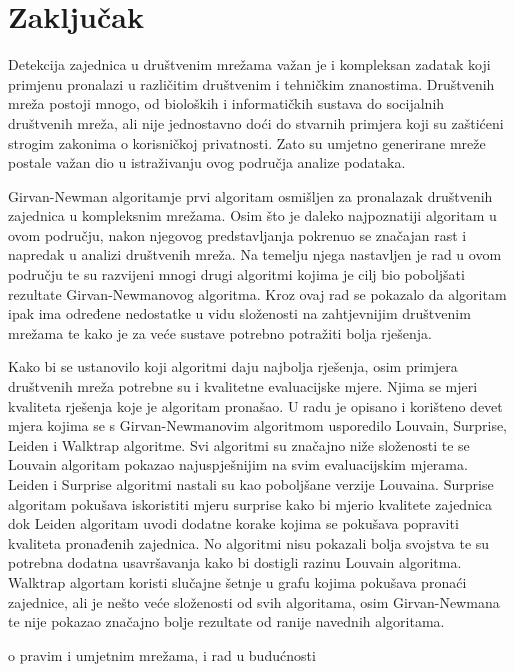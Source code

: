 \chapter{Zaključak}

Detekcija zajednica u društvenim mrežama važan je i kompleksan zadatak koji primjenu pronalazi u različitim društvenim i tehničkim znanostima. Društvenih mreža postoji mnogo, od bioloških i informatičkih sustava do socijalnih društvenih mreža, ali nije jednostavno doći do stvarnih primjera koji su zaštićeni strogim zakonima o korisničkoj privatnosti. Zato su umjetno generirane mreže postale važan dio u istraživanju ovog područja analize podataka.

Girvan-Newman algoritamje prvi algoritam osmišljen za pronalazak društvenih zajednica u kompleksnim mrežama. Osim što je daleko najpoznatiji algoritam u ovom području, nakon njegovog predstavljanja pokrenuo se značajan rast i napredak u analizi društvenih mreža. Na temelju njega nastavljen je rad u ovom području te su razvijeni mnogi drugi algoritmi kojima je cilj bio poboljšati rezultate Girvan-Newmanovog algoritma. Kroz ovaj rad se pokazalo da algoritam ipak ima određene nedostatke u vidu složenosti na zahtjevnijim društvenim mrežama te kako je za veće sustave potrebno potražiti bolja rješenja.

Kako bi se ustanovilo koji algoritmi daju najbolja rješenja, osim primjera društvenih mreža potrebne su i kvalitetne evaluacijske mjere. Njima se mjeri kvaliteta rješenja koje je algoritam pronašao. U radu je opisano i korišteno devet mjera kojima se s Girvan-Newmanovim algoritmom usporedilo Louvain, Surprise, Leiden i Walktrap algoritme. Svi algoritmi su značajno niže složenosti te se Louvain algoritam pokazao  najuspješnijim na svim evaluacijskim mjerama. Leiden i Surprise algoritmi nastali su kao poboljšane verzije Louvaina. Surprise algoritam pokušava iskoristiti mjeru surprise kako bi mjerio kvalitete zajednica dok Leiden algoritam uvodi dodatne korake kojima se pokušava popraviti kvaliteta pronađenih zajednica. No algoritmi nisu pokazali bolja svojstva te su potrebna dodatna usavršavanja kako bi dostigli razinu Louvain algoritma. Walktrap algortam koristi slučajne šetnje u grafu kojima pokušava pronaći zajednice, ali je nešto veće složenosti od svih algoritama, osim Girvan-Newmana te nije pokazao značajno bolje rezultate od ranije navednih algoritama.

o pravim i umjetnim mrežama, i rad u budućnosti